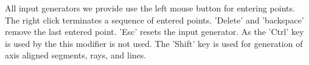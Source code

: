 All input generators we provide use the left mouse button for entering points.
The right click terminates a sequence of entered points. 'Delete' and 'backspace'
remove the last entered point. 'Esc' resets the input generator.  As the 'Ctrl' key
is used by the  this modifier is not used.  The 'Shift'
key is used for generation of axis aligned segments, rays, and lines. 

